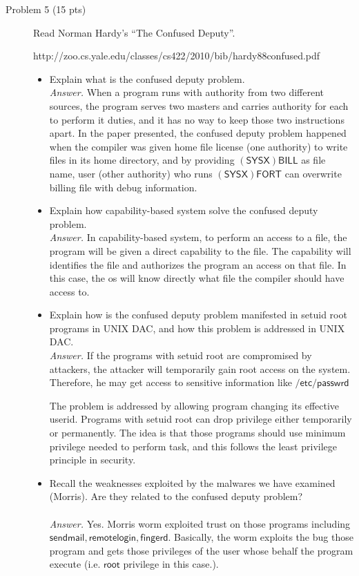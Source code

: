 \documentclass[11pt]{article}
\begin{document}
\begin{description}
 \item[Problem 5 (15 pts) ]
Read Norman Hardy's ``The Confused Deputy''.

http://zoo.cs.yale.edu/classes/cs422/2010/bib/hardy88confused.pdf
\begin{itemize}
 \item
Explain what is the confused deputy problem.
\\\textit{Answer. } When a program runs with authority from two different sources, the program serves two masters and carries authority for each to perform it duties, and it has no way to keep those two instructions apart. In the paper presented, the confused deputy problem happened when the compiler was given home file license (one authority) to write files in its home directory, and by providing $\mathsf{(SYSX)BILL}$ as file name, user (other authority) who runs $\mathsf{(SYSX)FORT}$ can overwrite billing file with debug information.  
 \item
Explain how capability-based system solve the confused deputy problem. 
\\\textit{Answer. } In capability-based system, to perform an access to a file, the program will be given a direct capability to the file. The capability will identifies the file and authorizes the program an access on that file. In this case, the os will know directly what file the compiler should have access to. 
 \item
Explain how is the confused deputy problem manifested in setuid root programs in UNIX DAC, and how this problem is addressed in UNIX DAC.
\\\textit{Answer. } 
If the programs with setuid root are compromised by attackers, the attacker will temporarily gain root access on the system. 
Therefore, he may get access to sensitive information like $\mathsf{/etc/passwrd}$

The problem is addressed by allowing program changing its effective userid. 
Programs with setuid root can drop privilege either temporarily or permanently. 
The idea is that those programs should use minimum privilege needed to perform task, and this follows the least privilege principle in security.

\item 
Recall the weaknesses exploited by the malwares we have examined (Morris).  Are they related to the confused deputy problem?\\
\\\textit{Answer. } Yes. Morris worm exploited trust on those programs including $\mathsf{sendmail, remote login, fingerd}$. 
Basically, the worm exploits the bug those program and gets those privileges of the user whose behalf the program execute (i.e. $\mathsf{root}$ privilege in this case.).
\end{itemize}



\end{description}
\end{document}
